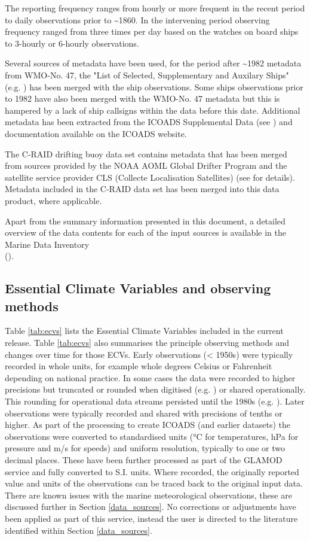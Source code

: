 The reporting frequency ranges from hourly or more frequent in the recent period to daily observations prior to \sim 1860. 
In the intervening period observing frequency ranged from three times per day based on the watches on board ships to 3-hourly or 6-hourly observations. 

Several sources of metadata have been used, for the period after \sim 1982 metadata from WMO-No. 47, the "List of Selected, Supplementary and Auxilary Ships" (e.g. \cite{Kent2007}) has been merged with the ship observations.
Some ships observations prior to 1982 have also been merged with the WMO-No. 47 metadata but this is hampered by a lack of ship callsigns within the data before this date.
Additional metadata has been extracted from the ICOADS Supplemental Data (see \cite{Freeman2017}) and documentation available on the ICOADS website.

The C-RAID drifting buoy data set contains metadata that has been merged from sources provided by the NOAA AOML Global Drifter Program and the satellite service provider CLS (Collecte Localisation Satellites) (see \cite{craid202404activity} for details). 
Metadata included in the C-RAID data set has been merged into this data product, where applicable.


Apart from the summary information presented in this document, a detailed overview of the data contents for each of the input sources is available in the Marine Data Inventory \\
(\inventoryref{}).

\subsection{Essential Climate Variables and observing methods}

Table \ref{tab:ecvs} lists the Essential Climate Variables included in the current release. 
Table \ref{tab:ecvs} also summarises the principle observing methods and changes over time for those ECVs.
Early observations (< 1950s) were typically recorded in whole units, for example whole degrees Celsius or Fahrenheit depending on national practice.
In some cases the data were recorded to higher precisions but truncated or rounded when digitised (e.g. \cite{Chan2019}) or shared operationally. 
This rounding for operational data streams persisted until the 1980s (e.g. \cite{Willett2008}).
Later observations were typically recorded and shared with precisions of tenths or higher.
As part of the processing to create ICOADS (and earlier datasets) the observations were converted to standardised units (°C for temperatures, hPa for pressure and m/s for speeds) and uniform resolution, typically to one or two decimal places.
These have been further processed as part of the GLAMOD service and fully converted to S.I. units.
Where recorded, the originally reported value and units of the observations can be traced back to the original input data.
There are known issues with the marine meteorological observations, these are discussed further in Section \ref{data_sources}.
No corrections or adjustments have been applied as part of this service, instead the user is directed to the literature identified within Section \ref{data_sources}.

